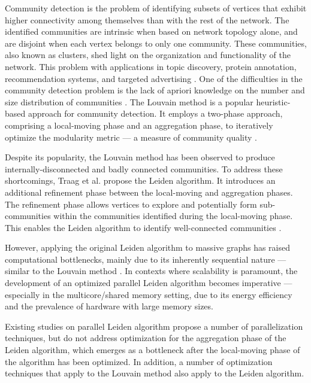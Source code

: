 Community detection is the problem of identifying subsets of vertices that exhibit higher connectivity among themselves than with the rest of the network. The identified communities are intrinsic when based on network topology alone, and are disjoint when each vertex belongs to only one community. These communities, also known as clusters, shed light on the organization and functionality of the network. This problem with applications in topic discovery, protein annotation, recommendation systems, and targeted advertising \cite{com-gregory10}. One of the difficulties in the community detection problem is the lack of apriori knowledge on the number and size distribution of communities \cite{com-blondel08}. The Louvain method \cite{com-blondel08} is a popular heuristic-based approach for community detection. It employs a two-phase approach, comprising a local-moving phase and an aggregation phase, to iteratively optimize the modularity metric --- a measure of community quality \cite{com-newman06}.

Despite its popularity, the Louvain method has been observed to produce internally-disconnected and badly connected communities. To address these shortcomings, Traag et al. \cite{com-traag19} propose the Leiden algorithm. It introduces an additional refinement phase between the local-moving and aggregation phases. The refinement phase allows vertices to explore and potentially form sub-communities within the communities identified during the local-moving phase. This enables the Leiden algorithm to identify well-connected communities \cite{com-traag19}.

However, applying the original Leiden algorithm to massive graphs has raised computational bottlenecks, mainly due to its inherently sequential nature --- similar to the Louvain method \cite{com-halappanavar17}. In contexts where scalability is paramount, the development of an optimized parallel Leiden algorithm becomes imperative --- especially in the multicore/shared memory setting, due to its energy efficiency and the prevalence of hardware with large memory sizes. Existing studies on parallel Leiden algorithm \cite{verweijfaster, nguyenleiden} propose a number of parallelization techniques, but do not address optimization for the aggregation phase of the Leiden algorithm, which emerges as a bottleneck after the local-moving phase of the algorithm has been optimized. In addition, a number of optimization techniques that apply to the Louvain method also apply to the Leiden algorithm.

